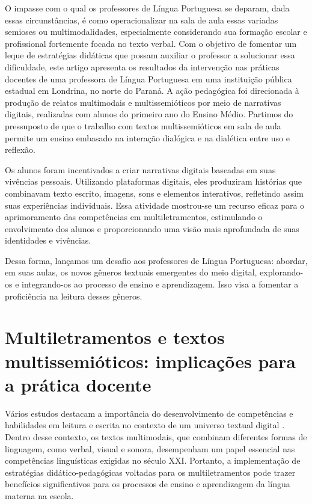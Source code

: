 \documentclass[portuguese]{textolivre}
\begin{document}
O impasse com o qual os professores de Língua Portuguesa se deparam, dada essas circunstâncias, é como operacionalizar na sala de aula essas variadas semioses ou multimodalidades, especialmente considerando sua formação escolar e profissional fortemente focada no texto verbal. Com o objetivo de fomentar um leque de estratégias didáticas que possam auxiliar o professor a solucionar essa dificuldade, este artigo apresenta os resultados da intervenção nas práticas docentes de uma professora de Língua Portuguesa em uma instituição pública estadual em Londrina, no norte do Paraná. A ação pedagógica foi direcionada à produção de relatos multimodais e multissemióticos por meio de narrativas digitais, realizadas com alunos do primeiro ano do Ensino Médio. Partimos do pressuposto de que o trabalho com textos multissemióticos em sala de aula permite um ensino embasado na interação dialógica e na dialética entre uso e reflexão.

Os alunos foram incentivados a criar narrativas digitais baseadas em suas vivências pessoais. Utilizando plataformas digitais, eles produziram histórias que combinavam texto escrito, imagens, sons e elementos interativos, refletindo assim suas experiências individuais. Essa atividade mostrou-se um recurso eficaz para o aprimoramento das competências em multiletramentos, estimulando o envolvimento dos alunos e proporcionando uma visão mais aprofundada de suas identidades e vivências.

Dessa forma, lançamos um desafio aos professores de Língua Portuguesa: abordar, em suas aulas, os novos gêneros textuais emergentes do meio digital, explorando-os e integrando-os ao processo de ensino e aprendizagem. Isso visa a fomentar a proficiência na leitura desses gêneros.



\section{Multiletramentos e textos multissemióticos: implicações para a prática docente}

Vários estudos destacam a importância do desenvolvimento de competências e habilidades em leitura e escrita no contexto de um universo textual digital \cite{dioni2005generos, rojo2012, rojo2012moura, ribeiro2016textos, coscarelli2016letramento}. Dentro desse contexto, os textos multimodais, que combinam diferentes formas de linguagem, como verbal, visual e sonora, desempenham um papel essencial nas competências linguísticas exigidas no século XXI. Portanto, a implementação de estratégias didático-pedagógicas voltadas para os multiletramentos pode trazer benefícios significativos para os processos de ensino e aprendizagem da língua materna na escola.
\end{document}
